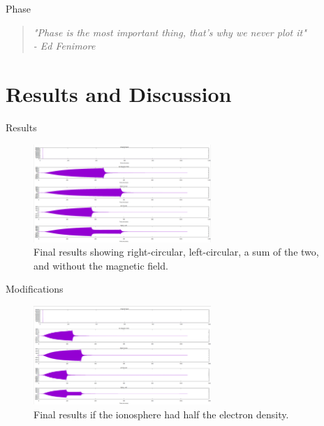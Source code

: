 \documentclass[10pt, aspectratio=168]{beamer}
\begin{document}
    \begin{frame}{Phase}
        \begin{quote}
            \huge{\textit{"Phase is the most important thing, that's why we never plot it" \\ - Ed Fenimore}}
        \end{quote}   
    \end{frame}
    
\section{Results and Discussion}

    \begin{frame}{Results}
        \begin{figure}[h]
            \centering
            \includegraphics[width=0.6\textwidth]{signal_final_results.png}
            \caption{Final results showing right-circular, left-circular, a sum of the two, and without the magnetic field.}
            \label{fig:final-results}
        \end{figure}
    \end{frame}
    
    \begin{frame}{Modifications}
        \begin{figure}[h]
            \centering
            \includegraphics[width=0.6\textwidth]{signal_stec_15.png}
            \caption{Final results if the ionosphere had half the electron density.}
            \label{fig:stec-15}
        \end{figure}
    \end{frame}
    
\end{document}
